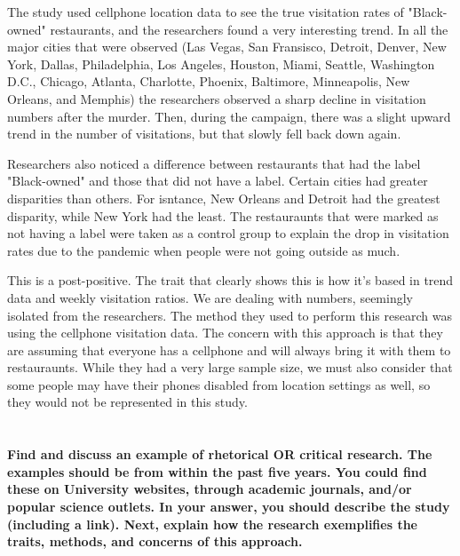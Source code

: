 \documentclass[a4paper]{article}
\begin{document}
        The study used cellphone location data to see the true visitation rates of "Black-owned" restaurants, and the researchers found 
        a very interesting trend. In all the major cities that were observed (Las Vegas, San Fransisco, Detroit, Denver, New York, Dallas, 
        Philadelphia, Los Angeles, Houston, Miami, Seattle, Washington D.C., Chicago, Atlanta, Charlotte, Phoenix, Baltimore, Minneapolis, 
        New Orleans, and Memphis) the researchers observed a sharp decline in visitation numbers after the murder. Then, during the campaign, 
        there was a slight upward trend in the number of visitations, but that slowly fell back down again. 

        Researchers also noticed a difference between restaurants that had the label "Black-owned" and those that did not have a label. 
        Certain cities had greater disparities than others. For isntance, New Orleans and Detroit had the greatest disparity, while New York
        had the least. The restauraunts that were marked as not having a label were taken as a control group to explain the drop in 
        visitation rates due to the pandemic when people were not going outside as much. 

        This is a post-positive. The trait that clearly shows this is how it's based in trend data and weekly visitation ratios. We are 
        dealing with numbers, seemingly isolated from the researchers. The method they used to perform this research was using the cellphone 
        visitation data. The concern with this approach is that they are assuming that everyone has a cellphone and will always bring it with them 
        to restauraunts. While they had a very large sample size, we must also consider that some people may have their phones disabled from location 
        settings as well, so they would not be represented in this study. 



    \section{}
        \textbf{Find and discuss an example of rhetorical OR critical research. The examples should be from within the past five years. You could find these on University websites, through academic journals, and/or popular science outlets. In your answer, you should describe the study (including a link). Next, explain how the research exemplifies the traits, methods, and concerns of this approach.}
    
	\pagebreak    
    
    
    \cite{wood2017}
    \cite{kobeTweet}
    \cite{eckart2022}
\end{document}
